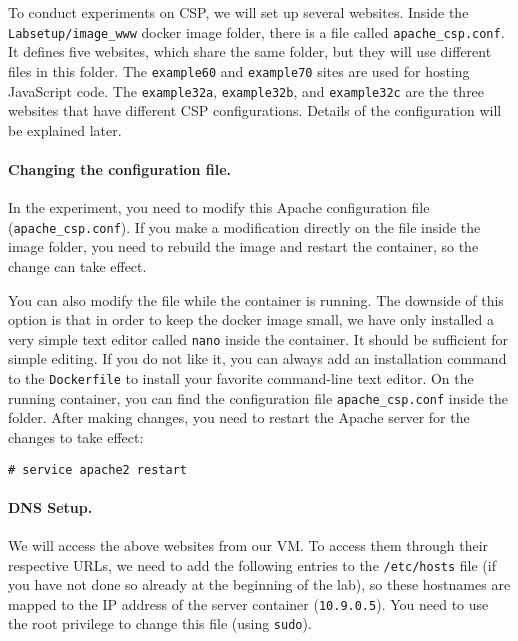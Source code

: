 To conduct experiments on CSP, we will set up several websites. 
Inside the \texttt{Labsetup/image\_www} docker image folder, 
there is a file called \texttt{apache\_csp.conf}.
It defines five websites, which share the same folder, but
they will use different files in this folder. 
The \texttt{example60} and \texttt{example70} sites are 
used for hosting JavaScript code.  The 
\texttt{example32a}, \texttt{example32b}, and 
\texttt{example32c} are the three websites that 
have different CSP configurations. Details of the configuration 
will be explained later.


\paragraph{Changing the configuration file.}
In the experiment, you need to modify this Apache 
configuration file (\texttt{apache\_csp.conf}). If you make a modification
directly on the file inside the image folder, you need to rebuild the image
and restart the container, so the change can take effect. 

You can also modify the file while the container is running. 
The downside of this 
option is that in order to keep the docker image small, 
we have only installed a very simple text editor called \texttt{nano} 
inside the container. It should be sufficient for simple editing.   
If you do not like it, you can always add an installation command
to the \texttt{Dockerfile} to install your favorite command-line
text editor. 
On the running container, you can find the configuration
file \texttt{apache\_csp.conf} inside the 
 folder.  
After making changes, you need to restart the Apache server for the 
changes to take effect:

\begin{lstlisting}
# service apache2 restart
\end{lstlisting}


\paragraph{DNS Setup.}
We will access the above websites from our VM. 
To access them through their respective URLs, 
we need to add the following entries to the 
\texttt{/etc/hosts} file (if you have not done so already
at the beginning of the lab), so these hostnames are mapped to 
the IP address of the server container (\texttt{10.9.0.5}). 
You need to use the root privilege to 
change this file (using \texttt{sudo}).

